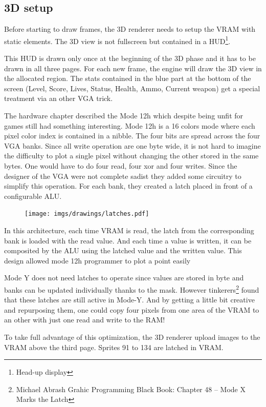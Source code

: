\subsection{3D setup}
Before starting to draw frames, the 3D renderer needs to setup the VRAM with static elements. The 3D view is not fullscreen but contained in a HUD\footnote{Head-up display}.
\begin{figure}[H]
  \centering
\end{figure}
This HUD is drawn only once at the beginning of the 3D phase and it has to be drawn in all three pages. For each new frame, the engine will draw the 3D view in the allocated region. The stats contained in the blue part at the bottom of the screen (Level, Score, Lives, Status, Health, Ammo, Current weapon) get a special treatment via an other VGA trick.\\
\par

The hardware chapter described the Mode 12h which despite being unfit for games still had something interesting. Mode 12h is a 16 colors mode where each pixel color index is contained in a nibble. The four bits are spread across the four VGA banks. Since all write operation are one byte wide, it is not hard to imagine the difficulty to plot a single pixel without changing the other stored in the same bytes. One would have to do four read, four xor and four writes. Since the designer of the VGA were not complete sadist they added some circuitry to simplify this operation. For each bank, they created a latch placed in front of a configurable ALU.\\
\par
 \begin{figure}[H]
\centering
 \texttt{[image: imgs/drawings/latches.pdf]}
 \end{figure}
In this architecture, each time VRAM is read, the latch from the corresponding bank is loaded with the read value. And each time a value is written, it can be composited by the ALU using the latched value and the written value. This design allowed mode 12h programmer to plot a point easily\\
\par
Mode Y does not need latches to operate since values are stored in byte and banks can be updated individually thanks to the mask. However tinkerers\footnote{Michael Abrash Grahic Programming Black Book: Chapter 48 -- Mode X Marks the Latch} found that these latches are still active in  Mode-Y. And by getting a little bit creative and repurposing them, one could copy four pixels from one area of the VRAM to an other with just one read and write to the RAM!\\
\par
To take full advantage of this optimization, the 3D renderer upload images to the VRAM above the third page. Sprites 91 to 134 are latched in VRAM.\\

